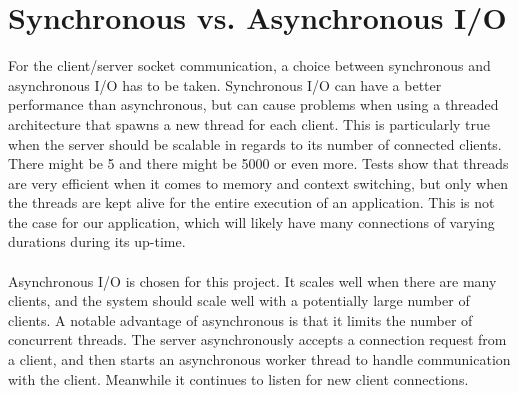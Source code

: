 % 







\section{Synchronous vs. Asynchronous I/O}
For the client/server socket communication, a choice between synchronous and asynchronous I/O has to be taken.
Synchronous I/O can have a better performance than asynchronous, but can cause problems when using a threaded architecture that spawns a new thread for each client. This is particularly true when the server should be scalable in regards to its number of connected clients. There might be 5 and there might be 5000 or even more.
Tests show that threads are very efficient when it comes to memory and context switching, but only when the threads are kept alive for the entire execution of an application. This is not the case for our application, which will likely have many connections of varying durations during its up-time. \\\\
Asynchronous I/O is chosen for this project. It scales well when there are many clients, and the system should scale well with a potentially large number of clients. A notable advantage of asynchronous is that it limits the number of concurrent threads. The server asynchronously accepts a connection request from a client, and then starts an asynchronous worker thread to handle communication with the client. Meanwhile it continues to listen for new client connections.


